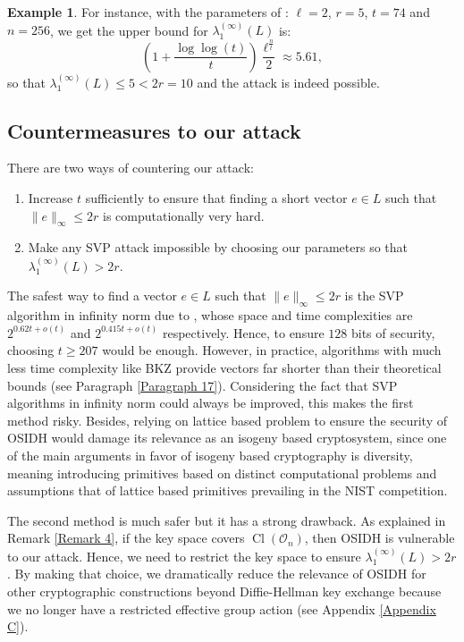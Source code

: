 \documentclass[a4paper,10pt,notitlepage]{report}
\theoremstyle{definition}
\theoremstyle{plain}
\theoremstyle{definition}
\newtheorem{Example}[Definition]{Example}
\newcommand{\mO}{\mathcal{O}}
\renewcommand{\(}{\left(}
\renewcommand{\)}{\right)}
\DeclareMathOperator{\Cl}{Cl}
\begin{document}
\begin{Example}
For instance, with the parameters of \cite[p. 28]{OSIDH}: $\ell=2$, $r=5$, $t=74$ and $n=256$, we get the upper bound for $\lambda_1^{(\infty)}(L)$ is:
\[\(1+\frac{\log\log(t)}{t}\)\frac{\ell^{\frac{n}{t}}}{2}\approx 5.61,\]
so that $\lambda_1^{(\infty)}(L)\leq 5<2r=10$ and the attack is indeed possible.
\end{Example}

\subsection{Countermeasures to our attack}

There are two ways of countering our attack: 
\begin{enumerate}
\item Increase $t$ sufficiently to ensure that finding a short vector $e\in L$ such that $\|e\|_\infty\leq 2r$ is computationally very hard.
\item Make any SVP attack impossible by choosing our parameters so that $\lambda_1^{(\infty)}(L)>2r$. 
\end{enumerate}

The safest way to find a vector $e\in L$ such that $\|e\|_\infty\leq 2r$ is the SVP algorithm in infinity norm due to \cite{Aggarwal2018}, whose space and time complexities are $2^{0.62t+o(t)}$ and $2^{0.415t+o(t)}$ respectively. Hence, to ensure $128$ bits of security, choosing $t\geq 207$ would be enough. However, in practice, algorithms with much less time complexity like BKZ \cite{BKZ} provide vectors far shorter than their theoretical bounds (see Paragraph \ref{Paragraph 17}). Considering the fact that SVP algorithms in infinity norm could always be improved, this makes the first method risky. Besides, relying on lattice based problem to ensure the security of OSIDH would damage its relevance as an isogeny based cryptosystem, since one of the main arguments in favor of isogeny based cryptography is diversity, meaning introducing primitives based on distinct computational problems and assumptions that of lattice based primitives prevailing in the NIST competition.

The second method is much safer but it has a strong drawback. As explained in Remark \ref{Remark 4}, if the key space covers $\Cl(\mO_n)$, then OSIDH is vulnerable to our attack. Hence, we need to restrict the key space to ensure $\lambda_1^{(\infty)}(L)>2r$. By making that choice, we dramatically reduce the relevance of OSIDH for other cryptographic constructions beyond Diffie-Hellman key exchange because we no longer have a restricted effective group action (see Appendix \ref{Appendix C}).
\end{document}
